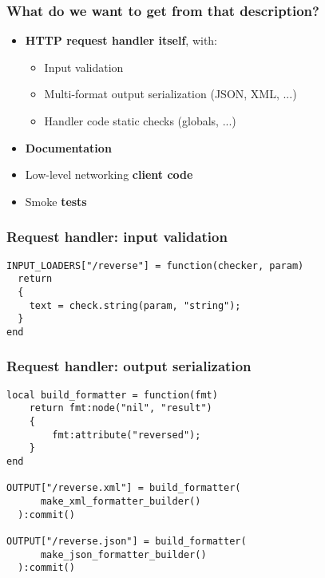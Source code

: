 \documentclass[handout]{beamer}
\begin{document}
\begin{frame}

\frametitle{What do we want to get from that description?}

\begin{itemize}
\item \textbf{HTTP request handler itself}, with:
  \begin{itemize}
  \item Input validation
  \item Multi-format output serialization (JSON, XML, ...)
  \item Handler code static checks (globals, ...)
  \end{itemize}
\item \textbf{Documentation}
\item Low-level networking \textbf{client code}
\item Smoke \textbf{tests}
\end{itemize}

\end{frame}


\begin{frame}[fragile]

\frametitle{Request handler: input validation}

\begin{verbatim}
INPUT_LOADERS["/reverse"] = function(checker, param)
  return
  {
    text = check.string(param, "string");
  }
end
\end{verbatim}

\end{frame}


\begin{frame}[fragile]

\frametitle{Request handler: output serialization}

\begin{verbatim}
local build_formatter = function(fmt)
    return fmt:node("nil", "result")
    {
        fmt:attribute("reversed");
    }
end

OUTPUT["/reverse.xml"] = build_formatter(
      make_xml_formatter_builder()
  ):commit()

OUTPUT["/reverse.json"] = build_formatter(
      make_json_formatter_builder()
  ):commit()
\end{verbatim}

\end{frame}
\end{document}
